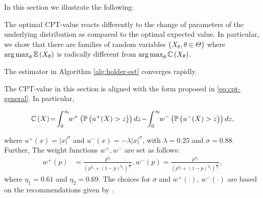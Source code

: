 In this section we illustrate the following: \\
\begin{inparaenum}[\bfseries (i)]
\item The optimal CPT-value reacts differently to the change of parameters of the underlying distribution as compared to the optimal expected value. In particular, we show that there are families of random variables $\{X_\theta, \theta \in \Theta\}$ where $\mathop{\rm arg\,max}_{\theta} \mathbb{E}\left( X_\theta \right)$ is radically different from 
$\mathop{\rm arg\,max}_{\theta} \mathbb{C} \left( X_\theta \right)$. \\
\item The estimator in Algorithm \ref{alg:holder-est} converges rapidly.
\end{inparaenum}

The CPT-value in this section is aligned with the form proposed in \eqref{eq:cpt-general}. In particular,
\begin{small}
\begin{align*}
\C\left(X\right) \!=\! \intinfinity \!\!w^+\left(\Prob{u^+(X)>z}\right) dz \!-\! \intinfinity \!\!w^-\left(\Prob{u^-(X)>z}\right) dz, 
\end{align*}
\end{small}
where $u^+(x) =  |x|^{\sigma}$  and  $u^-(x) = -\lambda |x|^{\sigma}$, 
with $\lambda = 0.25$ and $\sigma = 0.88$. Further, 
The weight functions $w^+,w^-$ are set as follows:
\begin{align*}
w^+(p) &= \frac{p^{\eta_1}}{{(p^{\eta_1}+ (1-p)^{\eta_1})}^{\frac{1}{\eta_1}}}, w^-(p) = \frac{p^{\eta_2}}{{(p^{\eta_2}+ (1-p)^{\eta_2})}^{\frac{1}{\eta_2}}},
\end{align*} 
where $\eta_1 = 0.61$ and $\eta_2 = 0.69$. The choices for $\sigma$ and $w^+(\cdot)$,  $w^-(\cdot)$ are based on the recommendations given by \cite{tversky1992advances}. 

